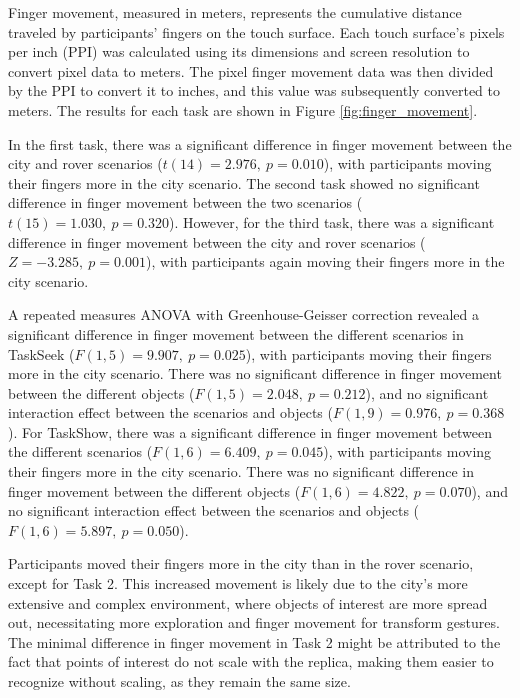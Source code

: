             Finger movement, measured in meters, represents the cumulative distance traveled by participants' fingers on the touch surface. Each touch surface's pixels per inch (PPI) was calculated using its dimensions and screen resolution to convert pixel data to meters. The pixel finger movement data was then divided by the PPI to convert it to inches, and this value was subsequently converted to meters. The results for each task are shown in Figure \ref{fig:finger_movement}. 

            In the first task, there was a significant difference in finger movement between the city and rover scenarios ($t(14) = 2.976,\ p = 0.010$), with participants moving their fingers more in the city scenario. The second task showed no significant difference in finger movement between the two scenarios ($t(15) = 1.030,\ p = 0.320$). However, for the third task, there was a significant difference in finger movement between the city and rover scenarios ($Z = -3.285,\ p = 0.001$), with participants again moving their fingers more in the city scenario.

            A repeated measures ANOVA with Greenhouse-Geisser correction revealed a significant difference in finger movement between the different scenarios in TaskSeek ($F(1, 5) = 9.907,\ p = 0.025$), with participants moving their fingers more in the city scenario. There was no significant difference in finger movement between the different objects ($F(1, 5) = 2.048,\ p = 0.212$), and no significant interaction effect between the scenarios and objects ($F(1, 9) = 0.976,\ p = 0.368$). For TaskShow, there was a significant difference in finger movement between the different scenarios ($F(1, 6) = 6.409,\ p = 0.045$), with participants moving their fingers more in the city scenario. There was no significant difference in finger movement between the different objects ($F(1, 6) = 4.822,\ p = 0.070$), and no significant interaction effect between the scenarios and objects ($F(1, 6) = 5.897,\ p = 0.050$).

            Participants moved their fingers more in the city than in the rover scenario, except for Task 2. This increased movement is likely due to the city's more extensive and complex environment, where objects of interest are more spread out, necessitating more exploration and finger movement for transform gestures. The minimal difference in finger movement in Task 2 might be attributed to the fact that points of interest do not scale with the replica, making them easier to recognize without scaling, as they remain the same size.


